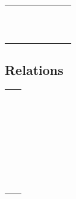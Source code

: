 	\begin{tabular}{*8l}
	\X\dotplus      &\X\smallsetminus \\ \X\Cap        &\X\Cup               \\
	\X\barwedge     &\X\veebar      \\ \X\doublebarwedge&\X\boxminus        \\
	\X\boxtimes     &\X\boxdot      \\ \X\boxplus     &\X\divideontimes     \\
	\X\ltimes       &\X\rtimes      \\ \X\leftthreetimes&\X\rightthreetimes \\
	\X\curlywedge   &\X\curlyvee    \\ \X\circleddash &\X\circledast        \\
	\X\circledcirc  &\X\centerdot   \\ \X\intercal
	\end{tabular}

	\subsection{{} Relations \showfamily}

	\begin{tabular}{*2l}
	\X\leqslant    \\\X\lesssim    \\
	\X\approxeq    \\\X\lll        \\
	\X\lesseqgtr   \\\X\doteqdot   \\
	\X\fallingdotseq\\\X\backsimeq  \\
	\X\Subset      \\\X\preccurlyeq\\
	\X\precsim     \\\X\vartriangleleft\\
	\X\vDash      \\\X\smallsmile \\
	\X\bumpeq      \\\X\geqq       \\
	\X\eqslantgtr  \\\X\gtrapprox  \\
	\X\ggg         \\\X\gtreqless  \\
	\X\eqcirc      \\\X\triangleq  \\
	\X\thickapprox \\\X\Supset     \\
	\X\succcurlyeq \\\X\succsim    \\
	\X\vartriangleright\\\X\Vdash      \\
	\X\shortparallel\\\X\pitchfork  \\
	\X\blacktriangleleft \\\X\backepsilon\\
	\X\because
	\end{tabular}


